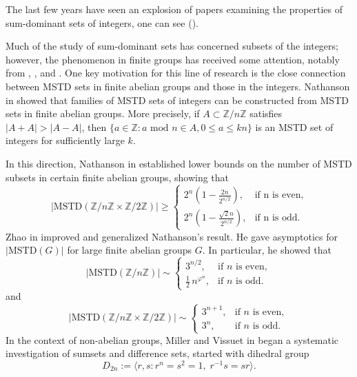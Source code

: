 \documentclass[11pt,reqno]{amsart}
\numberwithin{equation}{section}
\begin{document}
The last few years have seen an explosion of papers examining the properties of sum-dominant sets of integers, one can see (\cite{Hegarty_2007, Hegarty_Miller_2009, Chu_2022, Kim_Miller_2022, Miller_Scheinerman_2010, Miller_Peterson_2019, Asada_2017, Lazarev_Miller_OBryant_2013, Iyer_Lazarev_Miller_Zhang_2012, Martin_Bryant_2006,  Do_Kulkarni_Miller_Moon_Wellens_Wilcox_2015, Zhao_2010a}).\par
Much of the study of sum-dominant sets has concerned subsets of the
integers; however, the phenomenon in finite  groups has received
some attention, notably from  \cite{ Hegarty_2007}, \cite{Nathanson_2007},   \cite{Zhao_2010} and \cite{Penman_2014}. One key motivation for this line of research is the close connection between MSTD sets in finite abelian groups and those in the integers. Nathanson in \cite{Nathanson_2007} showed that families of MSTD sets of integers can be constructed from MSTD sets in finite abelian groups. More precisely, if
 $A\subset \mathbb{Z}/n\mathbb{Z}$ satisfies $|A+A|>|A-A|$, then $\{a\in\mathbb{Z} :a \text{ mod } n\in A,0\leq a\leq kn\}$ is an MSTD set of integers for sufficiently large $k$. \par
 In this direction, Nathanson in \cite{Nathanson_2007} established lower bounds on the number of MSTD subsets in certain finite abelian groups, showing that
 \begin{equation*}  
 |\text{MSTD}(\mathbb{Z}/n\mathbb{Z}\times\mathbb{Z}/2\mathbb{Z})|\geq
  \begin{cases}
   2^n(1-\frac{2n}{2^{n/2}}),  & \text{if n is even}, \\
       2^n(1-\frac{\sqrt{2}n}{2^{n/2}}),  & \text{if n is odd}.
      \end{cases}
    \end{equation*} 
Zhao in \cite{Zhao_2010} improved and generalized Nathanson’s result. He gave asymptotics for
$|\mathrm{MSTD}(G)|$ for large finite abelian groups $G$. In particular, he showed that $$
|\mathrm{MSTD}(\mathbb{Z}/n\mathbb{Z})| \sim
\begin{cases}
3^{n/2}, & \text{if $n$ is even}, \\
\frac{1}{2}\, n^{\varphi ^{n}}, & \text{if $n$ is odd}.
\end{cases}
$$ and $$
|\mathrm{MSTD}(\mathbb{Z}/n\mathbb{Z} \times \mathbb{Z}/2\mathbb{Z})| \sim
\begin{cases}
3^{n+1}, & \text{if $n$ is even}, \\
3^{n}, & \text{if $n$ is odd}.
\end{cases}
$$
In the context of non-abelian groups, Miller and Vissuet in  \cite{Miller_Vissuet_2014} began a systematic investigation of sumsets and difference sets, started with dihedral group  
$$D_{2n} := \langle r, s : r^n = s^2 = 1,\; r^{-1}s = sr \rangle.$$
 
\end{document}
